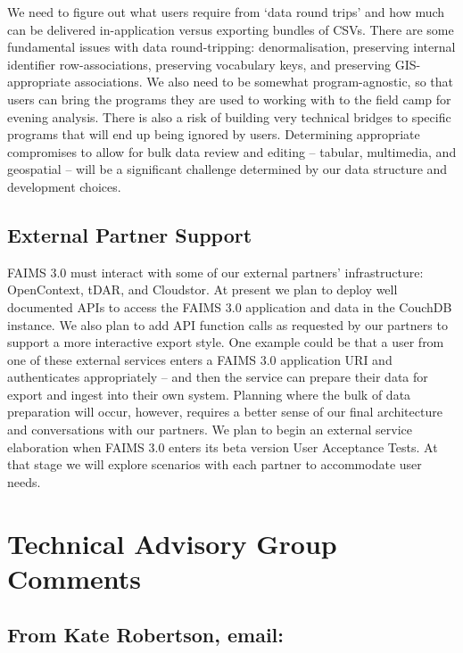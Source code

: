 \documentclass[a4paper,headings=small fontsize=10pt]{scrreprt}
\begin{document}
We need to figure out what users require from `data round trips' and how
much can be delivered in-application versus exporting bundles of CSVs.
There are some fundamental issues with data round-tripping:
denormalisation, preserving internal identifier row-associations,
preserving vocabulary keys, and preserving GIS-appropriate associations.
We also need to be somewhat program-agnostic, so that users can bring
the programs they are used to working with to the field camp for evening
analysis. There is also a risk of building very technical bridges to
specific programs that will end up being ignored by users. Determining
appropriate compromises to allow for bulk data review and editing --
tabular, multimedia, and geospatial -- will be a significant challenge
determined by our data structure and development choices.

\section{External Partner Support}

FAIMS 3.0 must interact with some of our external partners'
infrastructure: OpenContext, tDAR, and Cloudstor. At present we plan to
deploy well documented APIs to access the FAIMS 3.0 application and data
in the CouchDB instance. We also plan to add API function calls as
requested by our partners to support a more interactive export style.
One example could be that a user from one of these external services
enters a FAIMS 3.0 application URI and authenticates appropriately --
and then the service can prepare their data for export and ingest into
their own system. Planning where the bulk of data preparation will
occur, however, requires a better sense of our final architecture and
conversations with our partners. We plan to begin an external service
elaboration when FAIMS 3.0 enters its beta version User Acceptance
Tests. At that stage we will explore scenarios with each partner to
accommodate user needs.

\printbibliography


\chapter{Technical Advisory Group
Comments}

\section{From Kate Robertson,
email:}
\end{document}
